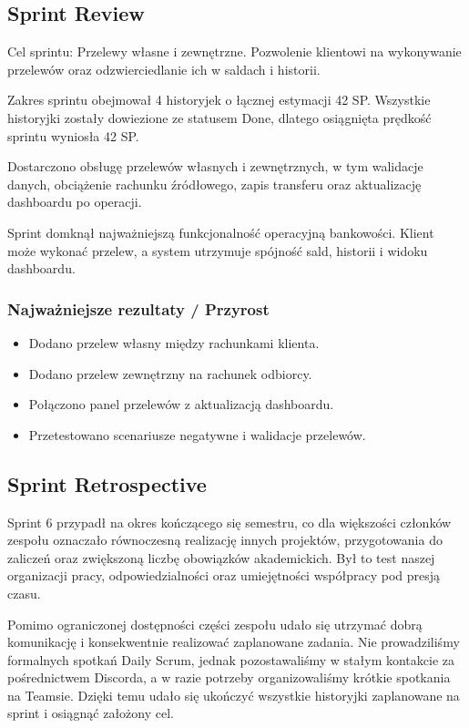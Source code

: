 \documentclass[12pt,a4paper]{article}
\begin{document}
\subsection*{Sprint Review}
Cel sprintu: Przelewy własne i zewnętrzne. Pozwolenie klientowi na wykonywanie przelewów oraz odzwierciedlanie ich w saldach i historii.

Zakres sprintu obejmował 4 historyjek o łącznej estymacji 42 SP. Wszystkie historyjki zostały dowiezione ze statusem Done, dlatego osiągnięta prędkość sprintu wyniosła 42 SP.

Dostarczono obsługę przelewów własnych i zewnętrznych, w tym walidacje danych, obciążenie rachunku źródłowego, zapis transferu oraz aktualizację dashboardu po operacji.

Sprint domknął najważniejszą funkcjonalność operacyjną bankowości. Klient może wykonać przelew, a system utrzymuje spójność sald, historii i widoku dashboardu.

\subsubsection*{Najważniejsze rezultaty / Przyrost}
\begin{itemize}
\item Dodano przelew własny między rachunkami klienta.
\item Dodano przelew zewnętrzny na rachunek odbiorcy.
\item Połączono panel przelewów z aktualizacją dashboardu.
\item Przetestowano scenariusze negatywne i walidacje przelewów.
\end{itemize}

\subsection*{Sprint Retrospective}
Sprint 6 przypadł na okres kończącego się semestru, co dla większości członków zespołu oznaczało równoczesną realizację innych projektów, przygotowania do zaliczeń oraz zwiększoną liczbę obowiązków akademickich. Był to test naszej organizacji pracy, odpowiedzialności oraz umiejętności współpracy pod presją czasu.

Pomimo ograniczonej dostępności części zespołu udało się utrzymać dobrą komunikację i konsekwentnie realizować zaplanowane zadania. Nie prowadziliśmy formalnych spotkań Daily Scrum, jednak pozostawaliśmy w stałym kontakcie za pośrednictwem Discorda, a w razie potrzeby organizowaliśmy krótkie spotkania na Teamsie. Dzięki temu udało się ukończyć wszystkie historyjki zaplanowane na sprint i osiągnąć założony cel.
\end{document}

